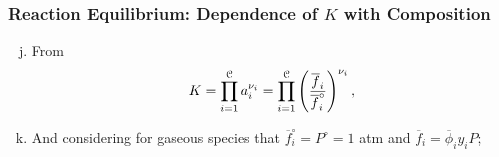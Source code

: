 \documentclass[10pt,compress,handout,unknownkeysallowed]{beamer}
\begin{document}
\begin{frame}
  \frametitle{Reaction Equilibrium:  Dependence of $K$ with Composition } 
      \begin{enumerate}[a)] \setcounter{enumi}{9} 
         \item<1-> From 
           \begin{displaymath}
                K = \prod\limits_{i=1}^{\mathcal{C}} a_{i}^{\nu_{i}} = \prod\limits_{i=1}^{\mathcal{C}} \left(\displaystyle\frac{\overline{f}_{i}}{\overline{f}_{i}^{\circ}}\right)^{\nu_{i}},
           \end{displaymath} 
         \item<2-> And considering for gaseous species that $\overline{f}_{i}^{\circ}=P^{\circ}=1$ atm and $\overline{f}_{i} = \overline{\phi}_{i}y_{i}P$;
      \end{enumerate}

\end{frame}
\end{document}
